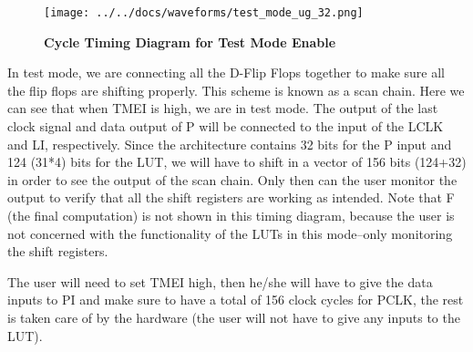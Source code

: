 \documentclass[a4paper]{article}
\begin{document}
    \begin{figure}[H]
        \centering
        \texttt{[image: ../../docs/waveforms/test\_mode\_ug\_32.png]}
        \caption{\textbf{Cycle Timing Diagram for Test Mode Enable}}
        \label{fig:gg}
    \end{figure}


    In test mode, we are connecting all the D-Flip Flops together to make sure all the flip flops are shifting properly. This
    scheme is known as a scan chain. Here we can see that when TMEI is high, we are in test mode. The output of the last clock
    signal and data output of P will be connected to the input of the LCLK and LI, respectively. Since the architecture contains
    32 bits for the P input and 124 (31*4) bits for the LUT, we will have to shift in a vector of 156 bits (124+32) in order to
    see the output of the scan chain. Only then can the user monitor the output to verify that all the shift registers are working
    as intended. Note that F (the final computation) is not shown in this timing diagram, because the user is not concerned with
    the functionality of the LUTs in this mode--only monitoring the shift registers.

    The user will need to set TMEI high, then he/she will have to give the data inputs to PI and make sure to have a total of
    156 clock cycles for PCLK, the rest is taken care of by the hardware (the user will not have to give any inputs to the LUT).

\end{document}
